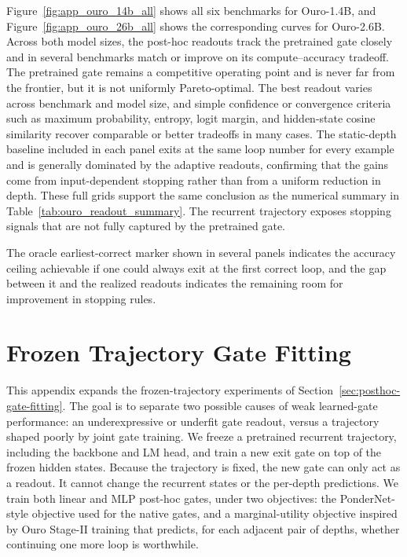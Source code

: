 \documentclass[10pt]{article} %
\begin{document}
Figure~\ref{fig:app_ouro_14b_all} shows all six benchmarks for Ouro-1.4B, and Figure~\ref{fig:app_ouro_26b_all} shows the corresponding curves for Ouro-2.6B. Across both model sizes, the post-hoc readouts track the pretrained gate closely and in several benchmarks match or improve on its compute--accuracy tradeoff. The pretrained gate remains a competitive operating point and is never far from the frontier, but it is not uniformly Pareto-optimal. The best readout varies across benchmark and model size, and simple confidence or convergence criteria such as maximum probability, entropy, logit margin, and hidden-state cosine similarity recover comparable or better tradeoffs in many cases. The static-depth baseline included in each panel exits at the same loop number for every example and is generally dominated by the adaptive readouts, confirming that the gains come from input-dependent stopping rather than from a uniform reduction in depth. These full grids support the same conclusion as the numerical summary in Table~\ref{tab:ouro_readout_summary}. The recurrent trajectory exposes stopping signals that are not fully captured by the pretrained gate.

The oracle earliest-correct marker shown in several panels indicates the accuracy ceiling achievable if one could always exit at the first correct loop, and the gap between it and the realized readouts indicates the remaining room for improvement in stopping rules.

\section{Frozen Trajectory Gate Fitting}
\label{app:posthoc-gates}

This appendix expands the frozen-trajectory experiments of Section~\ref{sec:posthoc-gate-fitting}. The goal is to separate two possible causes of weak learned-gate performance: an underexpressive or underfit gate readout, versus a trajectory shaped poorly by joint gate training. We freeze a pretrained recurrent trajectory, including the backbone and LM head, and train a new exit gate on top of the frozen hidden states. Because the trajectory is fixed, the new gate can only act as a readout. It cannot change the recurrent states or the per-depth predictions. We train both linear and MLP post-hoc gates, under two objectives: the PonderNet-style objective used for the native gates, and a marginal-utility objective inspired by Ouro Stage-II training that predicts, for each adjacent pair of depths, whether continuing one more loop is worthwhile.
\end{document}
